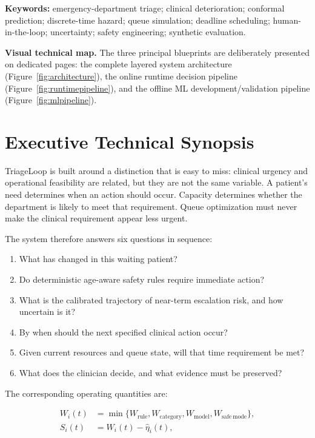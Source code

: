 \documentclass[11pt,a4paper]{article}
\begin{document}
\vspace{3mm}
\textbf{Keywords:} emergency-department triage; clinical deterioration; conformal prediction; discrete-time hazard; queue simulation; deadline scheduling; human-in-the-loop; uncertainty; safety engineering; synthetic evaluation.

\clearpage
\tableofcontents
\listoffigures
\listoftables
\vspace{4mm}
\noindent\colorbox{TBrandSoft}{\parbox{0.96\textwidth}{
\textbf{Visual technical map.} The three principal blueprints are deliberately presented on dedicated pages: the complete layered system architecture (Figure~\ref{fig:architecture}), the online runtime decision pipeline (Figure~\ref{fig:runtimepipeline}), and the offline ML development/validation pipeline (Figure~\ref{fig:mlpipeline}).
}}
\clearpage

\section{Executive Technical Synopsis}

TriageLoop is built around a distinction that is easy to miss: clinical urgency and operational feasibility are related, but they are not the same variable. A patient's need determines when an action should occur. Capacity determines whether the department is likely to meet that requirement. Queue optimization must never make the clinical requirement appear less urgent.

The system therefore answers six questions in sequence:

\begin{enumerate}
  \item What has changed in this waiting patient?
  \item Do deterministic age-aware safety rules require immediate action?
  \item What is the calibrated trajectory of near-term escalation risk, and how uncertain is it?
  \item By when should the next specified clinical action occur?
  \item Given current resources and queue state, will that time requirement be met?
  \item What does the clinician decide, and what evidence must be preserved?
\end{enumerate}

The corresponding operating quantities are:

\begin{align}
W_i(t) &= \min\{W_{\mathrm{rule}}, W_{\mathrm{category}}, W_{\mathrm{model}}, W_{\mathrm{safe\ mode}}\}, \\
S_i(t) &= W_i(t) - \widehat{\eta}_i(t),
\end{align}
\end{document}
